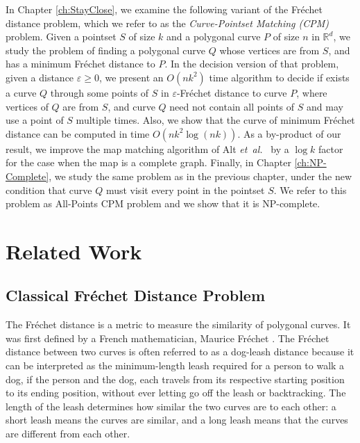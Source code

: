 \documentclass[12pt]{dalthesis}
\newcommand{\IR}{\ensuremath{\mathbb{R}}}
\newcommand{\eps}{\varepsilon}
\newcommand{\etal}{{\em et~al.\/}}
\newcommand{\REM}[1]{}
\newcommand{\Frechet}{Fr\'echet }
\newcommand{\pset}{S}
\begin{document}
In Chapter \ref{ch:StayClose},
we examine the following variant
of the \Frechet distance problem, 
which we refer to as the \emph{Curve-Pointset Matching (CPM)} problem. 
Given a pointset $\pset$ of size $k$ and a polygonal 
curve $P$ of size $n$ in $\IR^d$,
we study the problem of finding a polygonal curve $Q$ whose vertices are from  $\pset$,	
and has a minimum \Frechet distance to $P$. 
In the decision version of that problem, 
given a distance $\eps \ge 0$, we 
present an $O(nk^2)$ time algorithm 
to decide if exists a curve $Q$ through some points of $\pset$
in $\eps$-\Frechet distance to curve $P$, 
where vertices of $Q$ are from $\pset$, 
and curve $Q$ need not contain all points of $\pset$ 
and may use a point of $S$ multiple times. 
Also, we show that the
curve of minimum \Frechet distance can be computed in
time $O(nk^2 \log(nk))$.
As a by-product of our result, 
we improve the map matching algorithm of Alt \etal\ \cite{AltERW03a}
by a $\log k$ factor for the case when the map is a complete graph.
Finally, in Chapter \ref{ch:NP-Complete}, we 
study the same problem as in the previous chapter, 
under the new condition that 
curve $Q$ must visit every point in the pointset $\pset$.
We refer to this problem 
as All-Points CPM problem and 
we show that it is NP-complete. 

\REM{
Finally, in Chapter \ref{ch:SpecialCase},
we study some special cases of  All-Points CPM problem, 
where  instead of a general curve, the input to the problem is 
a convex $xy$-monotone curve, 
convex $x$-monotone curve (or convex $y$-monotone curve) or
a convex polygon. 
}
	

\clearpage{}


\clearpage{}\chapter{Related Work}
\label{ch:related}




\section{Classical \Frechet Distance Problem }
\label{sec:classicalFD}
The \Frechet distance is a metric to measure the similarity of polygonal curves. It was first defined by a French mathematician,
Maurice \Frechet \cite{FirstFD}.
The \Frechet distance between two curves is 
often referred to as a dog-leash distance because
it can be interpreted as the minimum-length leash required for a person to walk a dog,
if the person and the dog, each travels from its respective starting position to its ending position, without ever letting go off the leash or backtracking.
The length of the leash determines how similar the two curves are to each other:
a short leash means the curves are similar,
and a long leash means that the curves are different from each other.
\end{document}
